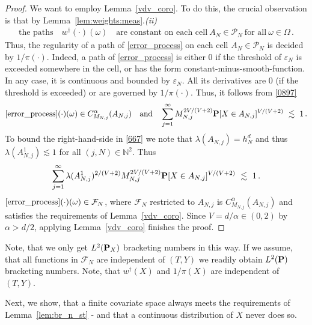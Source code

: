 \begin{proof}
  We want to employ Lemma~\ref{vdv_coro}. 
  To do this, the crucial observation is that by Lemma~\ref{lem:weights:meas}.\textit{(ii)}
  \begin{gather*}
    \text{the paths}\quad
    w^\dagger(\cdot)(\omega)
    \quad
    \text{are constant on each cell}\ 
    A_N\in\mathcal{P}_N
    \ \text{for all}\ \omega\in\Omega
    \,.
  \end{gather*}
  Thus, the regularity of a path of \eqref{error_process}
  on each cell $A_N\in\mathcal{P}_N$ is decided by 
  $1/\pi(\cdot)$.
  Indeed, a path of \eqref{error_process} is either 0 if the threshold of $\varepsilon_N$ is exceeded somewhere in the cell, or has the form constant-minus-smooth-function.
In any case, it is continuous and bounded by $\varepsilon_N$.
All its derivatives are 0 (if the threshold is exceeded) or are governed by $1/\pi(\cdot)$.
Thus, it follows from \eqref{0897}
\begin{gather}
  \eqref{error_process}(\cdot)(\omega)
  \in C^\alpha_{M_{N,j}}(A_{N,j})
  \quad
  \text{and}
  \quad
  \sum_{j=1}^{\infty} 
  M_{N,j}^{2V/(V+2)}
  \P
  [
  X\in A_{N,j}
  ]^{V/(V+2)}
  \ 
  \lesssim
  \ 
  1
  \,.
\end{gather}
To bound the right-hand-side in \eqref{667} we note
that 
$
\lambda(A_{N,j})=h^d_N
$ 
and thus
$
\lambda(A_{N,j}^1)\lesssim 1
$
for all $(j,N)\in\mathbb{N}^2$.
Thus
\begin{gather*}
  \sum_{j=1}^{\infty} 
  \lambda(A_{N,j}^1)^{2/(V+2)}
  M_{N,j}^{2V/(V+2)}
  \P
  [
  X\in A_{N,j}
  ]^{V/(V+2)}
  \ 
  \lesssim
  \ 
  1
  \,.
\end{gather*}
$
\eqref{error_process}(\cdot)(\omega)\in\mathcal{F}_N
$, 
where
$
\mathcal{F}_N
$
restricted to $A_{N,j}$ is 
$
  C^\alpha_{M_{N,j}}(A_{N,j})
$
and satisfies the requirements of Lemma~\ref{vdv_coro}.
Since $V=d/\alpha \in (0,2)$ by $\alpha>d/2$, 
applying Lemma~\ref{vdv_coro} finishes the proof.
\end{proof}
\begin{remark}
  Note, that we only get $L^2(\P_X)$ bracketing numbers in this way. If we assume, that all functions in $\mathcal{F}_N$ are independent of $(T,Y)$
  we readily obtain $L^2(\P)$ bracketing numbers. Note, that $w^\dagger(X)$ and $1/\pi(X)$ are independent of $(T,Y)$.  
\end{remark}
Next, we show, that a finite covariate space always meets the requirements of Lemma~\ref{lem:br_n_st} - and that a continuous distribution of $X$ never does so.

